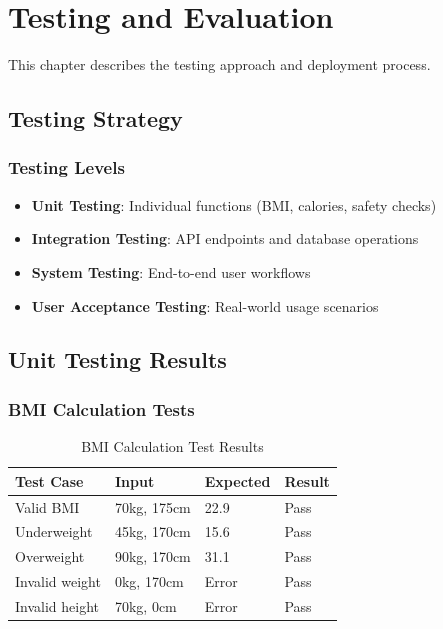 \chapter{Testing and Evaluation}

This chapter describes the testing approach and deployment process.

\section{Testing Strategy}

\subsection{Testing Levels}

\begin{itemize}
    \item \textbf{Unit Testing}: Individual functions (BMI, calories, safety checks)
    \item \textbf{Integration Testing}: API endpoints and database operations
    \item \textbf{System Testing}: End-to-end user workflows
    \item \textbf{User Acceptance Testing}: Real-world usage scenarios
\end{itemize}

\section{Unit Testing Results}

\subsection{BMI Calculation Tests}

\begin{table}[H]
\centering
\begin{tabular}{|l|l|l|l|}
\hline
\textbf{Test Case} & \textbf{Input} & \textbf{Expected} & \textbf{Result} \\
\hline
Valid BMI & 70kg, 175cm & 22.9 & Pass \\
Underweight & 45kg, 170cm & 15.6 & Pass \\
Overweight & 90kg, 170cm & 31.1 & Pass \\
Invalid weight & 0kg, 170cm & Error & Pass \\
Invalid height & 70kg, 0cm & Error & Pass \\
\hline
\end{tabular}
\caption{BMI Calculation Test Results}
\end{table}

